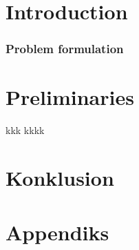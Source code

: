 \documentclass[a4paper,10pt,titlepage]{paper}
\begin{document}
\section{Introduction}


\subsubsection*{Problem formulation}


\section{Preliminaries}

kkk \cite{Carsten}
kkkk \cite{SynthesisPlans}

\section{Konklusion}

\newpage


\newpage
\section{Appendiks}
\end{document}
